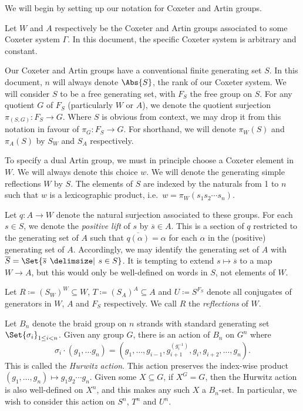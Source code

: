 We will begin by setting up our notation for Coxeter and Artin groups.

Let $W$ and  $A$ respectively be the Coxeter and Artin groups associated to some Coxeter system  $\Gamma$.
In this document, the specific Coxeter system is arbitrary and constant.

Our Coxeter and Artin groups have a conventional finite generating set $S$.
In this document, $n$ will always denote $\Abs{S}$, the rank of our Coxeter system.
We will consider $S$ to be a free generating set, with $F_S$ the free group on $S$.
For any quotient $G$  of $F_S$ (particularly  $W$ or $A$), we denote the quotient surjection  $\pi_{(S,G)} \colon F_S \to G$.
Where $S$ is obvious from context, we may drop it from this notation in favour of  $\pi_G \colon F_S \to G$.
For shorthand, we will denote  $\pi_{W}(S)$ and  $\pi_{A}(S)$ by $S_W$ and  $S_A$ respectively.

To specify a dual Artin group, we must in principle choose a Coxeter element in $W$.
We will always denote this choice  $w$.
We will denote the generating simple reflections $W$ by $S$.
The elements of $S$ are indexed by the naturals from 1 to $n$ such that $w$ is a lexicographic product, i.e.~$w=\pi_{W}(s_1s_2\cdots s_n)$.

Let $q \colon A \to W$ denote the natural surjection associated to these groups.
For each $s \in S$, we denote the \emph{positive lift} of $s$ by  $\overline{s} \in A$.
This is a section of  $q$ restricted to the generating set of $A$ such that $\overline{q(\alpha)} = \alpha$ for each  $\alpha$ in the (positive) generating set of  $A$.
Accordingly, we may identify the generating set of  $A$ with  $\overline{S}=\Set{\overline{s} \given s \in S}$.
It is tempting to extend $s \mapsto \overline{s}$ to a  map $W \to A$, but this would only be well-defined on words in $S$, not elements of $W$.

Let $R \coloneq (S_W)^{W} \subseteq W$, $T \coloneq (S_A)^{A} \subseteq A$ and $U \coloneq S^{F_S}$ denote all conjugates of generators in $W$, $A$ and $F_S$ respectively.
We call $R$ the \emph{reflections} of  $W$.

Let  $B_n$ denote the braid group on  $n$ strands with standard generating set $\Set{\sigma_i}_{1 \leq i < n} $.
Given any group $G$, there is an action of  $B_n$ on  $G^n$ where
\[
	\sigma_i \cdot  \left( g_1, \ldots g_n \right) = \left( g_1,\ldots,g_{i-1}, g_{i+1}^{\left(g_i^{-1}\right)}, g_{i}, g_{i+2}, \ldots, g_n \right)
	.\]
This is called the \emph{Hurwitz action}.
This action preserves the index-wise product $(g_1, \ldots, g_n) \mapsto g_1g_2\cdots g_n$.
Given some $X \subseteq G$, if $X^G = G$, then the Hurwitz action is also well-defined on $X^n$, and this makes any such $X$ a  $B_n$-set.
In particular, we wish to consider this action on $S^n$, $T^n$ and $U^n$.


